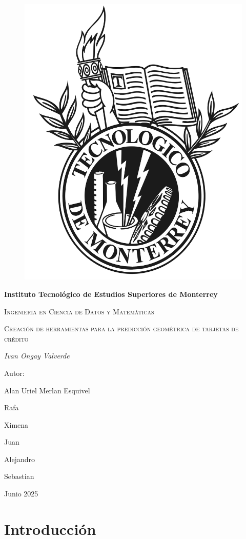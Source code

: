 \documentclass[12pt]{article}
\begin{document}
    \begin{titlepage}
        \centering
        \begin{figure} [H]
            \centering
            \includegraphics[width=0.25\linewidth]{logotec.png}
        \end{figure}
        \vspace{1cm}
        {\bfseries\LARGE Instituto Tecnológico de Estudios Superiores de Monterrey \par}
        \vspace{1cm}
        {\scshape\Large Ingeniería en Ciencia de Datos y Matemáticas \par}
        \vspace{2cm}
        {\scshape\LARGE Creación de herramientas para la predicción geométrica de tarjetas de crédito\par}
        \vspace{1cm}
        {\itshape\Large Ivan Ongay Valverde \par}
        \vfill
        {\Large Autor:  \par}
        {\Large Alan Uriel Merlan Esquivel\par}
        {\Large Rafa\par}
        {\Large Ximena\par}
        {\Large Juan\par}
        {\Large Alejandro\par}
        {\Large Sebastian\par}
        \vfill
        {\Large Junio 2025 \par}
    \end{titlepage}




\begin{Large}
\tableofcontents
\end{Large}%
\pagebreak

\section{Introducción} \label{sec:intro}

\end{document}
